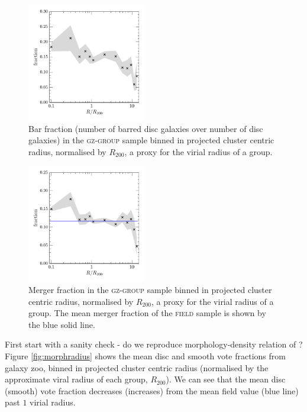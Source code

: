 \documentclass[useAMS,usenatbib]{mn2e}
\begin{document}
\begin{figure}
\includegraphics[width=0.46\textwidth]{bar_fraction_over_disc_trend_with_log_radius.pdf}
\caption{Bar fraction (number of barred disc galaxies over number of disc galaxies) in the \textsc{gz-group} sample binned in projected cluster centric radius, normalised by $R_{200}$, a proxy for the virial radius of a group.}
\label{fig:barradius}
\end{figure}

\begin{figure}
\includegraphics[width=0.46\textwidth]{merger_fraction_trend_with_log_radius_compare_field.pdf}
\caption{Merger fraction in the \textsc{gz-group} sample binned in projected cluster centric radius, normalised by $R_{200}$, a proxy for the virial radius of a group. The mean merger fraction of the \textsc{field} sample is shown by the blue solid line.}
\label{fig:mergerradius}
\end{figure}

First start with a sanity check - do we reproduce morphology-density relation of \citealt{dressler80}? Figure \ref{fig:morphradius} shows the mean disc and smooth vote fractions from galaxy zoo, binned in projected cluster centric radius (normalised by the approximate viral radius of each group, $R_{200}$). We can see that the mean disc (smooth) vote fraction decreases (increases) from the mean field value (blue line) past $1$ virial radius.
\end{document}
